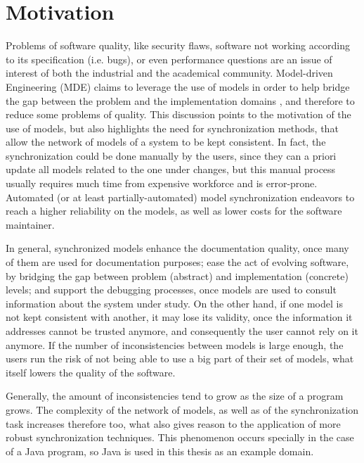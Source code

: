 \documentclass[tuberlin,cic,tc,english,noabntcite]{iiufrgs}
\begin{document}
\section{Motivation}
Problems of software quality, like security flaws, software not working according to its specification (i.e. bugs), or even performance questions are an issue of interest of both the industrial and the academical community. Model-driven Engineering (MDE) claims to leverage the use of models in order to help bridge the gap between the problem and the implementation domains \citep{france2007model}, and therefore to reduce some problems of quality. This discussion points to the motivation of the use of models, but also highlights the need for synchronization methods, that allow the network of models of a system to be kept consistent. In fact, the synchronization could be done manually by the users, since they can a priori update all models related to the one under changes, but this manual process usually requires much time from expensive workforce and is error-prone. Automated (or at least partially-automated) model synchronization endeavors to reach a higher reliability on the models, as well as lower costs for the software maintainer.

In general, synchronized models enhance the documentation quality, once many of them are used for documentation purposes; ease the act of evolving software, by bridging the gap between problem (abstract) and implementation (concrete) levels; and support the debugging processes, once models are used to consult information about the system under study. On the other hand, if one model is not kept consistent with another, it may lose its validity, once the information it addresses cannot be trusted anymore, and consequently the user cannot rely on it anymore. If the number of inconsistencies between models is large enough, the users run the risk of not being able to use a big part of their set of models, what itself lowers the quality of the software.

Generally, the amount of inconsistencies tend to grow as the size of a program grows. The complexity of the network of models, as well as of the synchronization task increases therefore too, what also gives reason to the application of more robust synchronization techniques. This phenomenon occurs specially in the case of a Java program, so Java is used in this thesis as an example domain.

\end{document}
